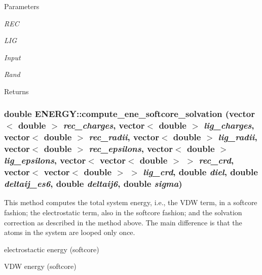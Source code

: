 \begin{DoxyParams}{Parameters}
\item[{\em REC}]\item[{\em LIG}]\item[{\em Input}]\item[{\em Rand}]\end{DoxyParams}
\begin{DoxyReturn}{Returns}

\end{DoxyReturn}
\hypertarget{classENERGY_a161909a8b166eeb653561abfcb49c54b}{
\subsubsection[{compute\_\-ene\_\-softcore\_\-solvation}]{\setlength{\rightskip}{0pt plus 5cm}double ENERGY::compute\_\-ene\_\-softcore\_\-solvation (vector$<$ double $>$ {\em rec\_\-charges}, \/  vector$<$ double $>$ {\em lig\_\-charges}, \/  vector$<$ double $>$ {\em rec\_\-radii}, \/  vector$<$ double $>$ {\em lig\_\-radii}, \/  vector$<$ double $>$ {\em rec\_\-epsilons}, \/  vector$<$ double $>$ {\em lig\_\-epsilons}, \/  vector$<$ vector$<$ double $>$ $>$ {\em rec\_\-crd}, \/  vector$<$ vector$<$ double $>$ $>$ {\em lig\_\-crd}, \/  double {\em diel}, \/  double {\em deltaij\_\-es6}, \/  double {\em deltaij6}, \/  double {\em sigma})}}
\label{classENERGY_a161909a8b166eeb653561abfcb49c54b}
This method computes the total system energy, i.e., the VDW term, in a softcore fashion; the electrostatic term, also in the softcore fashion; and the solvation correction as described in the method above. The main difference is that the atoms in the system are looped only once. 

electrostactic energy (softcore)

VDW energy (softcore)

